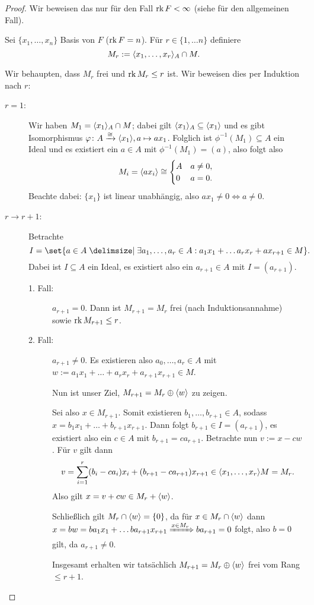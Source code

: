 \documentclass[12pt,a4paper]{scrartcl}
\theoremstyle{cplain}
\theoremstyle{cdef}
\begin{document}
\begin{proof}
	Wir beweisen das nur für den Fall $\operatorname{rk} F<\infty$ (siehe \cite[Theorem 6.1]{hungerford} für den allgemeinen Fall).
	
	Sei $\{x_1,\dots, x_n\}$ Basis von $F$ ($\operatorname{rk} F = n$). Für $r\in\{1,\dots n\}$ definiere
	\[M_r := \langle x_1,\dots, x_r\rangle_A\cap M.\]
	
	Wir behaupten, dass $M_r$ frei und $\operatorname{rk} M_r \le r$ ist. Wir beweisen dies per Induktion nach $r$:
	\begin{description}
		\item[$r = 1$:] Wir haben $M_1 = \langle x_1\rangle_A\cap M$; dabei gilt $\langle x_1\rangle_A\subseteq \langle x_1\rangle$ und es gibt Isomorphismus $\varphi\colon A\xrightarrow{\cong} \langle x_1\rangle, a\mapsto ax_1$. Folglich ist $\phi^{-1}(M_1)\subseteq A$ ein Ideal und es existiert ein $a\in A$ mit $\phi^{-1}(M_1) = (a)$, also folgt also \[M_i = \langle ax_i\rangle \cong \begin{cases} A & a\neq 0,\\ 0& a= 0.\end{cases}\]
		Beachte dabei: $\{x_1\}$ ist linear unabhängig, also $ax_1\neq 0 \Leftrightarrow a\neq 0$.
		\item[$r\to r+1$:] Betrachte
		\[ I = \set{a\in A \given \exists a_1,\dots, a_r\in A: a_1x_1+\dots a_rx_r+ax_{r+1}\in M}. \]
		Dabei ist $I\subseteq A$ ein Ideal, es existiert also ein $a_{r+1}\in A$ mit $I = (a_{r+1})$.
		\begin{description}
			\item[1. Fall:] $a_{r+1} = 0$. Dann ist $M_{r+1} = M_r$ frei (nach Induktionsannahme) sowie $\operatorname{rk} M_{r+1}\le r$.
			\item[2. Fall:] $a_{r+1}\neq 0$. Es existieren also $a_0,\dots, a_r\in A$ mit $w := a_1x_1+\dots+a_rx_r+a_{r+1}x_{r+1}\in M$.
			
			Nun ist unser Ziel, $M_{r+1} = M_r\oplus \langle w\rangle$ zu zeigen.
			
			Sei also $x\in M_{r+1}$. Somit existieren $b_1,\dots, b_{r+1}\in A$, sodass $x = b_1x_1+\dots + b_{r+1}x_{r+1}$. Dann folgt $b_{r+1}\in I = (a_{r+1})$, es existiert also ein $c\in A$ mit $b_{r+1} = ca_{r+1}$. Betrachte nun $v := x-cw$. Für $v$ gilt dann
			\[v= \sum_{i = 1}^r (b_i-ca_i)x_i+(b_{r+1}-ca_{r+1})x_{r+1}\in \langle x_1,\dots, x_r\rangle M = M_r.\]
			Also gilt $x = v+cw\in M_r+\langle w\rangle$.
			
			Schließlich gilt $M_r\cap\langle w\rangle = \{0\}$, da für $x\in M_r\cap\langle w\rangle$ dann $x = bw = ba_1x_1+\dots ba_{r+1}x_{r+1}\xRightarrow{x\in M_r} ba_{r+1} = 0$ folgt, also $b = 0$ gilt, da $a_{r+1} \neq 0$.
			
			Insgesamt erhalten wir tatsächlich $M_{r+1} = M_r\oplus \langle w\rangle$ frei vom Rang $\le r+1$. \qedhere 
		\end{description}
	\end{description}
	
\end{proof}
\end{document}
